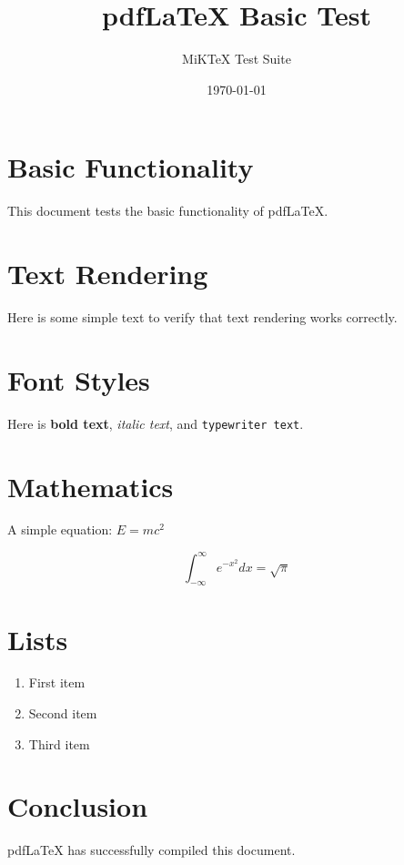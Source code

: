 \documentclass{article}
\title{pdfLaTeX Basic Test}
\author{MiKTeX Test Suite}
\date{\today}
\begin{document}
\maketitle

\section{Basic Functionality}
This document tests the basic functionality of pdfLaTeX.

\section{Text Rendering}
Here is some simple text to verify that text rendering works correctly.

\section{Font Styles}
Here is \textbf{bold text}, \textit{italic text}, and \texttt{typewriter text}.

\section{Mathematics}
A simple equation: $E = mc^2$

\[
\int_{-\infty}^{\infty} e^{-x^2} dx = \sqrt{\pi}
\]

\section{Lists}
\begin{enumerate}
  \item First item
  \item Second item
  \item Third item
\end{enumerate}

\section{Conclusion}
pdfLaTeX has successfully compiled this document.
\end{document}
